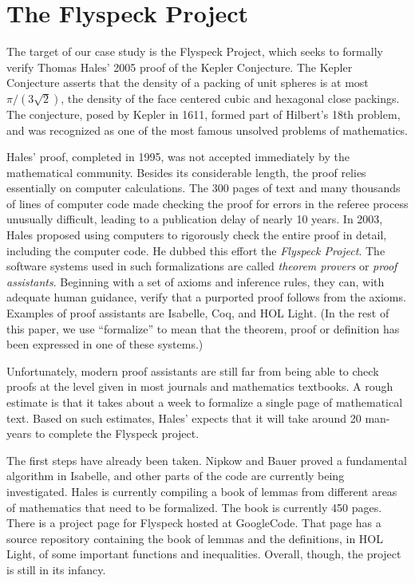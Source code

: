 
\section{The Flyspeck Project}
\label{sec:flyspeck}
  The target of our case study is the Flyspeck Project, which seeks
to formally verify Thomas Hales' 2005 proof of the Kepler Conjecture.  
The Kepler Conjecture asserts that the density of a packing of unit spheres
is at most $\pi/(3\sqrt{2})$, the density of the face centered cubic and 
hexagonal close packings.  The conjecture, posed by Kepler in 1611, formed part
of Hilbert's 18th problem, and was recognized as one of the most famous unsolved
problems of mathematics.    

  Hales' proof, completed in 1995, was not accepted immediately by the mathematical community. 
Besides its considerable length,  the proof relies essentially on computer calculations.  
The 300 pages of text and many thousands of lines of computer code made
checking the proof for errors in the referee process unusually difficult,
leading to a publication delay of nearly 10 years.  
In 2003, Hales proposed using computers to rigorously check the entire proof in
detail, including the computer code.  He dubbed this
effort the \textit{Flyspeck Project}.  
The software systems used in such formalizations are called \textit{theorem provers}
or \textit{proof assistants}.
Beginning with a set of axioms and inference rules, they can,
with adequate human guidance, verify that a purported proof follows from the axioms.  
Examples of proof assistants are Isabelle\cite{Isabelle}, Coq\cite{Coq}, 
and HOL Light\cite{HOLL}. (In the rest of this paper, we use ``formalize'' to mean
that the theorem, proof or definition has been expressed in one of these systems.) 

  Unfortunately, modern proof assistants are still far from being able to check
proofs at the level given in most journals and mathematics textbooks.  A rough
estimate is that it takes about a week to formalize a single page of mathematical
text.  Based on such estimates, Hales' expects that it will take 
around 20 man-years to complete the Flyspeck project.  

The first steps have already been taken.  Nipkow and
Bauer\cite{FlyspeckI:Nipkow} proved a fundamental algorithm in 
Isabelle\cite{Isabelle:definition}, and other parts of the code are
currently being investigated.  Hales is currently compiling a book\cite{FlyspeckBook}
of lemmas from different areas of mathematics that need to be formalized.    
The book is currently 450 pages.  
There is a project page\cite{GoogleCode:Flyspeck}
for Flyspeck hosted at GoogleCode\cite{GoogleCode}.  That page has a source repository
containing the book of lemmas and the definitions, in HOL Light, of some important functions
and inequalities.  Overall, though, the project is still in its infancy.

